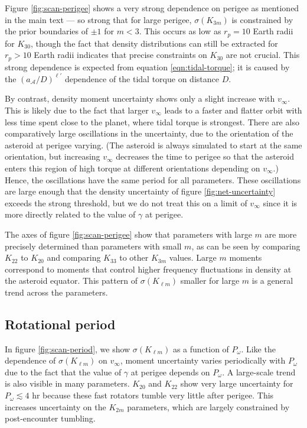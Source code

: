 Figure \ref{fig:scan-perigee} shows a very strong dependence on perigee as mentioned in the main text --- so strong that for large perigee, $\sigma(K_{3m})$ is constrained by the prior boundaries of $\pm 1$ for $m < 3$. This occurs as low as $r_p = 10$ Earth radii for $K_{30}$, though the fact that density distributions can still be extracted for $r_p > 10$ Earth radii indicates that precise constraints on $K_{30}$ are not crucial. This strong dependence is expected from equation \ref{eqn:tidal-torque}; it is caused by the $(a_\mathcal{A}/D)^{\ell'}$ dependence of the tidal torque on distance $D$.

By contrast, density moment uncertainty shows only a slight increase with $v_\infty$. This is likely due to the fact that larger $v_\infty$ leads to a faster and flatter orbit with less time spent close to the planet, where tidal torque is strongest. There are also comparatively large oscillations in the uncertainty, due to the orientation of the asteroid at perigee varying. (The asteroid is always simulated to start at the same orientation, but increasing $v_\infty$ decreases the time to perigee so that the asteroid enters this region of high torque at different orientations depending on $v_\infty$.) Hence, the oscillations have the same period for all parameters. These oscillations are large enough that the density uncertainty of figure \ref{fig:net-uncertainty} exceeds the strong threshold, but we do not treat this on a limit of $v_\infty$ since it is more directly related to the value of $\gamma$ at perigee.

The axes of figure \ref{fig:scan-perigee} show that parameters with large $m$ are more precisely determined than parameters with small $m$, as can be seen by comparing $K_{22}$ to $K_{20}$ and comparing $K_{33}$ to other $K_{3m}$ values. Large $m$ moments correspond to moments that control higher frequency fluctuations in density at the asteroid equator. This pattern of $\sigma(K_{\ell m})$ smaller for large $m$ is a general trend across the parameters.


\subsection{Rotational period}
\label{sec:scan-period}

In figure \ref{fig:scan-period}, we show $\sigma(K_{\ell m})$ as a function of $P_\omega$. Like the dependence of $\sigma(K_{\ell m})$ on $v_\infty$, moment uncertainty varies periodically with $P_\omega$ due to the fact that the value of $\gamma$ at perigee depends on $P_\omega$. A large-scale trend is also visible in many parameters. $K_{20}$ and $K_{22}$ show very large uncertainty for $P_\omega \lesssim 4$ hr because these fast rotators tumble very little after perigee. This increases uncertainty on the $K_{2m}$ parameters, which are largely constrained by post-encounter tumbling.

